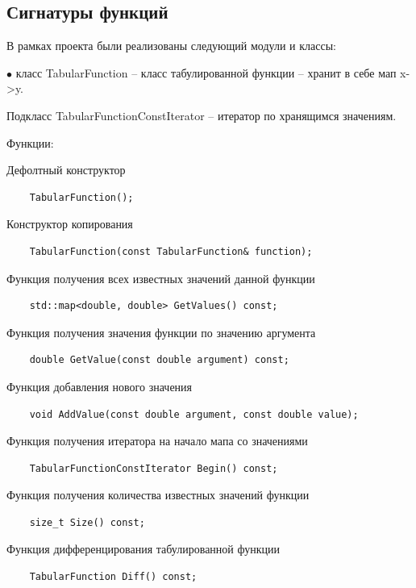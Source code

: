 \documentclass{article}
\theoremstyle{definition}
\theoremstyle{remark}
\begin{document}
\subsection{Сигнатуры функций}
В рамках проекта были реализованы следующий модули и классы:


$\bullet$ класс TabularFunction -- класс табулированной функции -- хранит в себе мап x->y.


Подкласс TabularFunctionConstIterator -- итератор по хранящимся значениям.


Функции:

Дефолтный конструктор
\begin{lstlisting}
	TabularFunction();
\end{lstlisting}


Конструктор копирования

\begin{lstlisting}
	TabularFunction(const TabularFunction& function);
\end{lstlisting}

Функция получения всех известных значений данной функции

\begin{lstlisting}
	std::map<double, double> GetValues() const;
\end{lstlisting}

Функция получения значения функции по значению аргумента

\begin{lstlisting}
	double GetValue(const double argument) const;
\end{lstlisting}


Функция добавления нового значения

\begin{lstlisting}
	void AddValue(const double argument, const double value);
\end{lstlisting}


Функция получения итератора на начало мапа со значениями

\begin{lstlisting}
	TabularFunctionConstIterator Begin() const;
\end{lstlisting}


Функция получения количества известных значений функции
\begin{lstlisting}
	size_t Size() const;
\end{lstlisting}


Функция дифференцирования табулированной функции

\begin{lstlisting}
	TabularFunction Diff() const;
\end{lstlisting}
\end{document}
